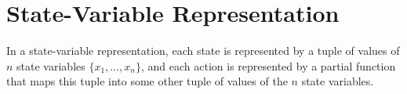 \section{State-Variable Representation}
In a state-variable representation, each state is represented by a
tuple of values of $n$ state variables $\lbrace x_1,\dots,x_n\rbrace$, and each action is represented
by a partial function that maps this tuple into some other tuple of values of the
$n$ state variables. 
\begin{comment}
This approach is especially useful for representing domains
in which a state is a set of attributes that range over finite domains and whose
values change over time.
\end{comment}



%







